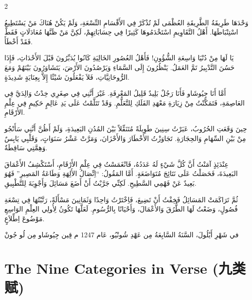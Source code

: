 \documentclass[11pt,a4paper]{article}
\newcommand{\ar}[1]{\arabicfont\beginR #1\endR}
\newcommand{\zhtext}[1]{{\chinese #1}}
\newenvironment{bilingual}{%
  \begin{paracol}{2}
}{%
  \end{paracol}
}
\begin{document}
\begin{bilingual}
\begin{rightcolumn*}
\ar{وَحْدَهَا طَرِيقَةُ الطَّرِيقَةِ العُظْمَى لَمْ تُذْكَرْ فِي الأَقْسَامِ التِّسْعَةِ، وَلَمْ يَكُنْ هُنَاكَ مَنْ يَسْتَطِيعُ اسْتِنْبَاطَهَا. أَهْلُ التَّقَاوِيمِ اسْتَخْدَمُوهَا كَثِيرًا فِي حِسَابَاتِهِمْ، لَكِنَّ مَنْ ظَنَّهَا مُعَادَلَاتٍ فَقَطْ فَقَدْ أَخْطَأَ.}

\ar{يَا لَهَا مِنْ دُنْيَا وَاسِعَةِ الشُّؤُونِ! فَأَهْلُ العُصُورِ الخَالِيَةِ كَانُوا يُدَبِّرُونَ قَبْلَ الأَحْدَاثِ، فَإِذَا حَسُنَ التَّدْبِيرُ تَمَّ العَمَلُ. يَنْظُرُونَ إِلَى السَّمَاءِ وَيَرْصُدُونَ الأَرْضَ، يَتَشَاوَرُونَ بَيْنَهُمْ وَمَعَ الرُّوحَانِيَّاتِ، فَلاَ يَفْعَلُونَ شَيْئًا إِلاَّ بِعِنَايَةٍ شَدِيدَةٍ.}

\ar{أَمَّا أَنَا جِيُوشَاو فَأَنَا رَجُلٌ بَلِيدٌ قَلِيلُ المَعْرِفَةِ. غَيْرَ أَنَّنِي فِي صِغَرِي خِدْتُ وَالِدَيَّ فِي العَاصِمَةِ، فَتَمَكَّنْتُ مِنْ زِيَارَةِ مَعْهَدِ الفَلَكِ لِلتَّعَلُّمِ. وَقَدْ تَتَلَّمْتُ عَلَى يَدِ عَالِمٍ حَكِيمٍ فِي عِلْمِ الأَرْقَامِ.}

\ar{حِينَ وَقَعَتِ الحُرُوبُ، عَبَرْتُ سِنِينَ طَوِيلَةً مُتَنَقِّلاً بَيْنَ المُدُنِ البَعِيدَةِ، وَلَمْ أَظُنَّ أَنَّنِي سَأَنْجُو مِنْ بَيْنِ السِّهَامِ وَالحِجَارَةِ. تَجَاوَزْتُ الأَخْطَارَ وَالأَحْزَانَ، وَمَرَّتْ عَشْرُ سَنَوَاتٍ، وَقَلْبِي يَابِسٌ وَهِمَّتِي سَاقِطَةٌ.}

\ar{عِنْدَئِذٍ آمَنْتُ أَنَّ كُلَّ شَيْءٍ لَهُ عَدَدُهُ، فَانْغَمَسْتُ فِي عِلْمِ الأَرْقَامِ، أَسْتَكْشِفُ الأَعْمَاقَ البَعِيدَةَ، فَحَصَلْتُ عَلَى نَتَائِجَ مُتَوَاضَعَةٍ. أَمَّا المَقُولُ: \enquote{اِتِّصَالُ الأَلِهَةِ وَطَاعَةُ المَصِيرِ} فَهُوَ بَعِيدٌ عَنْ فَهْمِي السَّطِيحِ. لَكِنِّي جَرَّبْتُ أَنْ أَضَعَ مَسَائِلَ وَأَجْوِبَةَ لِلتَّطْبِيقِ.}

\ar{ثُمَّ تَرَاكَمَتْ المَسَائِلُ فَخِفْتُ أَنْ تَضِيعَ، فَاِخْتَرْتُ وَاحِدًا وَثَمَانِينَ مَسْأَلَةً، رَتَّبْتُهَا فِي تِسْعَةِ فُصُولٍ، وَضَعْتُ لَهَا الطُّرُقَ وَالأَعْمَالَ، وَأَحْيَانًا بِالرُّسُومِ. لَعَلَّهَا تَكُونُ لِأُولِي العِلْمِ الوَاسِعِ مَوْضُوعَ اِطِّلاَعٍ.}

\vfill
\ar{\hfill في شَهْرِ أَيْلُولَ، السَّنَةُ السَّابِعَةُ مِن عَهْدِ شُونْيُو، عَام 1247 م}
\ar{\hfill قِين جِيُوشَاو مِن لُو جُونْ}
\end{rightcolumn*}

\end{bilingual}

\newpage

\section{The Nine Categories in Verse (\zhtext{九类赋})}
\end{document}

